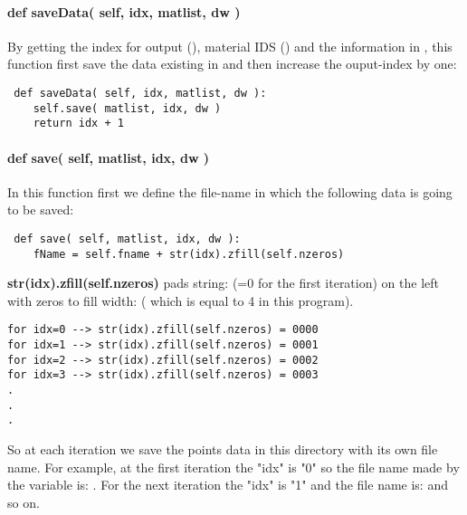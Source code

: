 \paragraph{def saveData( self, idx, matlist, dw )}
By getting the index for output (), material IDS () and the information in , this function first save the data existing in  and then increase the ouput-index by one:
\begin{lstlisting}
 def saveData( self, idx, matlist, dw ):
	self.save( matlist, idx, dw )
	return idx + 1
\end{lstlisting}
\paragraph{def save( self, matlist, idx, dw )}
In this function first we define the file-name in which the following data is going to be saved:
\begin{lstlisting}
 def save( self, matlist, idx, dw ):	
	fName = self.fname + str(idx).zfill(self.nzeros)
\end{lstlisting}

\textbf{str(idx).zfill(self.nzeros)} pads string: (=0 for the first iteration) on the left with zeros to fill width: ( which is equal to 4 in this program). 
\begin{lstlisting}
for idx=0 --> str(idx).zfill(self.nzeros) = 0000
for idx=1 --> str(idx).zfill(self.nzeros) = 0001
for idx=2 --> str(idx).zfill(self.nzeros) = 0002
for idx=3 --> str(idx).zfill(self.nzeros) = 0003
.
.
.
\end{lstlisting}
So at each iteration we save the points data in this directory with its own file name. For example, at the first iteration the "idx" is "0" so the file name made by the  variable is: . For the next iteration the "idx" is "1" and the file name is:  and so on.
